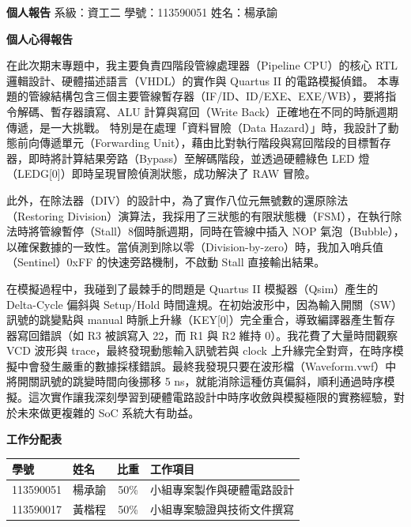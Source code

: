 \documentclass[12pt, a4paper]{article}
\begin{document}
\noindent
\textbf{個人報告} \hfill 系級：資工二 \quad 學號：113590051 \quad 姓名：楊承諭

\vspace{1.5em}
\begin{center}
    {\Large \textbf{個人心得報告}}
\end{center}
\vspace{1em}

在此次期末專題中，我主要負責四階段管線處理器（Pipeline CPU）的核心 RTL 邏輯設計、硬體描述語言（VHDL）的實作與 Quartus II 的電路模擬偵錯。
本專題的管線結構包含三個主要管線暫存器（IF/ID、ID/EXE、EXE/WB），要將指令解碼、暫存器讀寫、ALU 計算與寫回（Write Back）正確地在不同的時脈週期傳遞，是一大挑戰。
特別是在處理「資料冒險（Data Hazard）」時，我設計了動態前向傳遞單元（Forwarding Unit），藉由比對執行階段與寫回階段的目標暫存器，即時將計算結果旁路（Bypass）至解碼階段，並透過硬體綠色 LED 燈（LEDG[0]）即時呈現冒險偵測狀態，成功解決了 RAW 冒險。

此外，在除法器（DIV）的設計中，為了實作八位元無號數的還原除法（Restoring Division）演算法，我採用了三狀態的有限狀態機（FSM），在執行除法時將管線暫停（Stall）8個時脈週期，同時在管線中插入 NOP 氣泡（Bubble），以確保數據的一致性。當偵測到除以零（Division-by-zero）時，我加入哨兵值（Sentinel）0xFF 的快速旁路機制，不啟動 Stall 直接輸出結果。

在模擬過程中，我碰到了最棘手的問題是 Quartus II 模擬器（Qsim）產生的 Delta-Cycle 偏斜與 Setup/Hold 時間違規。在初始波形中，因為輸入開關（SW）訊號的跳變點與 manual 時脈上升緣（KEY[0]）完全重合，導致編譯器產生暫存器寫回錯誤（如 R3 被誤寫入 22，而 R1 與 R2 維持 0）。我花費了大量時間觀察 VCD 波形與 trace，最終發現動態輸入訊號若與 clock 上升緣完全對齊，在時序模擬中會發生嚴重的數據採樣錯誤。最終我發現只要在波形檔（Waveform.vwf）中將開關訊號的跳變時間向後挪移 5 ns，就能消除這種仿真偏斜，順利通過時序模擬。這次實作讓我深刻學習到硬體電路設計中時序收斂與模擬極限的實務經驗，對於未來做更複雜的 SoC 系統大有助益。

\vspace{2em}
\noindent
\textbf{工作分配表}
\vspace{0.5em}

\begin{table}[H]
    \centering
    \begin{tabular}{llcl}
        \toprule
        \textbf{學號} & \textbf{姓名} & \textbf{比重} & \textbf{工作項目} \\ \midrule
        113590051 & 楊承諭 & 50\% & 小組專案製作與硬體電路設計 \\
        113590017 & 黃楷程 & 50\% & 小組專案驗證與技術文件撰寫 \\ \bottomrule
    \end{tabular}
\end{table}
\end{document}
